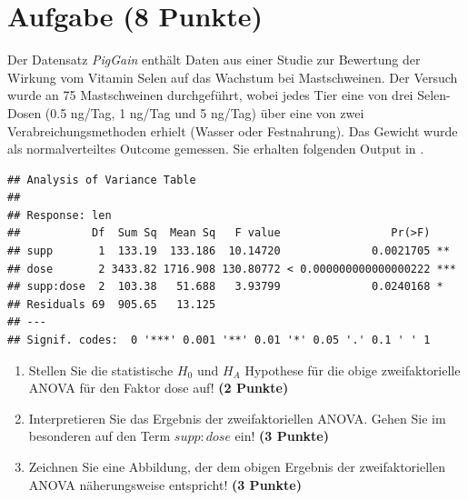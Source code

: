 \documentclass[a4paper, 10pt]{scrartcl}\usepackage[]{graphicx}\usepackage[]{color}
\makeatletter
\newenvironment{kframe}{%
 \def\at@end@of@kframe{}%
 \ifinner\ifhmode%
  \def\at@end@of@kframe{\end{minipage}}%
  \begin{minipage}{\columnwidth}%
 \fi\fi%
 \def\FrameCommand##1{\hskip\@totalleftmargin \hskip-\fboxsep
 \colorbox{shadecolor}{##1}\hskip-\fboxsep
     \hskip-\linewidth \hskip-\@totalleftmargin \hskip\columnwidth}%
 \MakeFramed {\advance\hsize-\width
   \@totalleftmargin\z@ \linewidth\hsize
   \@setminipage}}%
 {\par\unskip\endMakeFramed%
 \at@end@of@kframe}
\newenvironment{knitrout}{}{} %
\makeatother
\begin{document}
 
\clearpage

\section{Aufgabe \hfill (8 Punkte)}



Der Datensatz \textit{PigGain} enth{\"a}lt Daten aus einer Studie zur Bewertung
der Wirkung vom Vitamin Selen auf das Wachstum bei Mastschweinen. Der Versuch
wurde an 75 Mastschweinen durchgef{\"u}hrt, wobei jedes Tier
eine von drei Selen-Dosen (0.5 ng/Tag, 1 ng/Tag und 5 ng/Tag) {\"u}ber eine von zwei
Verabreichungsmethoden erhielt (Wasser oder Festnahrung). Das Gewicht
wurde als normalverteiltes Outcome gemessen. Sie erhalten folgenden Output
in \Rlogo.

\begin{knitrout}
\color{fgcolor}\begin{kframe}
\begin{verbatim}
## Analysis of Variance Table
## 
## Response: len
##           Df  Sum Sq  Mean Sq   F value                 Pr(>F)    
## supp       1  133.19  133.186  10.14720              0.0021705 ** 
## dose       2 3433.82 1716.908 130.80772 < 0.000000000000000222 ***
## supp:dose  2  103.38   51.688   3.93799              0.0240168 *  
## Residuals 69  905.65   13.125                                     
## ---
## Signif. codes:  0 '***' 0.001 '**' 0.01 '*' 0.05 '.' 0.1 ' ' 1
\end{verbatim}
\end{kframe}
\end{knitrout}

\begin{enumerate}
\item Stellen Sie die statistische $H_0$ und $H_A$ Hypothese f{\"u}r die obige
  zweifaktorielle ANOVA f{\"u}r den Faktor dose
  auf! \textbf{(2 Punkte)}
\item Interpretieren Sie das Ergebnis der zweifaktoriellen ANOVA. Gehen Sie
  im besonderen auf den Term $supp:dose$ ein! \textbf{(3 Punkte)}
\item Zeichnen Sie eine Abbildung, der dem obigen Ergebnis der
  zweifaktoriellen ANOVA n{\"a}herungsweise entspricht! \textbf{(3 Punkte)}
\end{enumerate}
 
\clearpage
\end{document}
